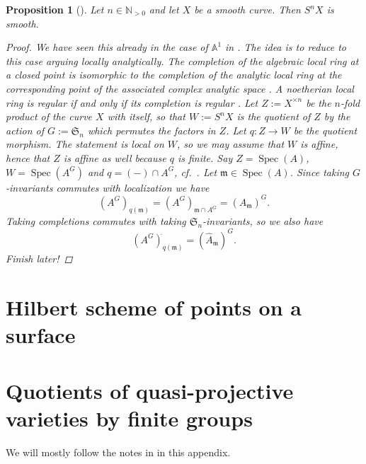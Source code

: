 \documentclass[12pt,a4paper]{amsart}
\theoremstyle{plain}
\newtheorem{prop}[thm]{Proposition}
\theoremstyle{definition}
\theoremstyle{remark}
\begin{document}
\begin{prop}[{\cite[Proposition 3.1]{rot16}}]
  Let $n \in \mathbb{N}_{>0}$ and let $X$ be a smooth curve.
  Then $S^{n}X$ is smooth.

  \begin{proof}
    We have seen this already in the case of $\mathbb{A}^{1}$ in .
    The idea is to reduce to this case arguing locally analytically.
    The completion of the algebraic local ring at a closed point is isomorphic to the completion of the analytic local ring at the corresponding point of the associated complex analytic space \cite[Proposition 3]{ser56}.
    A noetherian local ring is regular if and only if its completion is regular \cite[\href{https://stacks.math.columbia.edu/tag/07NY}{Tag 07NY}]{stacks-project}.
    Let $Z := X^{\times n}$ be the $n$-fold product of the curve $X$ with itself, so that $W := S^{n}X$ is the quotient of $Z$ by the action of $G := \mathfrak{S}_{n}$ which permutes the factors in $Z$.
    Let $q \colon Z \to W$ be the quotient morphism.
    The statement is local on $W$, so we may assume that $W$ is affine, hence that $Z$ is affine as well because $q$ is finite.
    Say $Z = \operatorname{Spec}(A)$, $W = \operatorname{Spec}(A^{G})$ and $q = (-) \cap A^{G}$, cf.~.
    Let $\mathfrak{m} \in \operatorname{Spec}(A)$.
    Since taking $G$-invariants commutes with localization \cite[Exercise 5.12]{am69} we have
    \[ (A^{G})_{q(\mathfrak{m})} = (A^{G})_{\mathfrak{m} \cap A^{G}} = (A_{\mathfrak{m}})^{G}. \]
    Taking completions commutes with taking $\mathfrak{S}_{n}$-invariants, so we also have
    \[ (A^{G})_{q(\mathfrak{m})}^{\hat{}} = (\hat{A}_{\mathfrak{m}})^{G}. \]
    \color{red} Finish later! \color{black}
  \end{proof}
\end{prop}

\section{Hilbert scheme of points on a surface}

\appendix

\section{Quotients of quasi-projective varieties by finite groups}\label{sec:quotient}

We will mostly follow the notes in \cite[Appendix A]{mus11} in this appendix.
\end{document}
